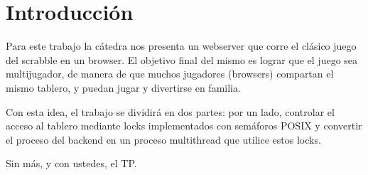 \section{Introducción}

Para este trabajo la cátedra nos presenta un webserver que corre el clásico juego del scrabble en un browser. El objetivo final del mismo es lograr que el juego sea multijugador, de manera de que muchos jugadores (browsers) compartan el mismo tablero, y puedan jugar y divertirse en familia.

Con esta idea, el trabajo se dividirá en dos partes: por un lado, controlar el acceso al tablero mediante locks implementados con semáforos POSIX y convertir el proceso del backend en un proceso multithread que utilice estos locks.

Sin más, y con ustedes, el TP.
